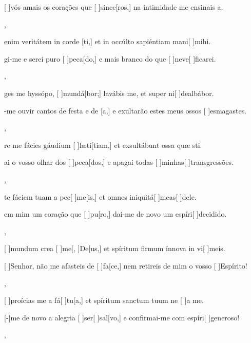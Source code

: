 {    {\item {}[ ]{vós} amais os corações que [ ]{sin}{ce}[ros,] na intimidade me ensinais a.~\Antiphona},
  {\item {} enim veritátem in corde [ti,] et in occúlto sapiéntiam mani[ ]{mi}hi.~\Antiphona}%
    {\item {}gi-me e serei puro [ ]{pe}{ca}[do,] e mais branco do que [ ]{ne}{ve}[ ]{fica}rei.~\Antiphona},
  {\item {}ges me hyssópo, [ ]{mun}{dá}[bor;] lavábis me, et super ni[ ]{de}{al}{bá}bor.~\Antiphona}%
    {\item {}-me ouvir cantos de festa e de [a,] e exultarão estes meus ossos [ ]{es}{ma}{gas}tes.~\Antiphona},
  {\item {}re me fácies gáudium [ ]{læ}{tí}[tiam,] et exsultábunt ossa quæ sti.~\Antiphona}%
    {\item {}ai o vosso olhar dos [ ]{pe}{ca}[dos,] e apagai todas [ ]{mi}{nhas}[ ]{transgres}sões.~\Antiphona},
  {\item {}te fáciem tuam a pec[ ]{me}[is,] et omnes iniquitá[ ]{me}{as}[ ]{de}le.~\Antiphona}%
    {\item {} em mim um coração que [ ]{pu}[ro,] dai-me de novo um espíri[ ]{de}{ci}{di}do.~\Antiphona},
  {\item {}[ ]{mun}dum crea [ ]{me}[, ]{De}[us,] et spíritum firmum ínnova in vi[ ]{me}is.~\Antiphona}%
    {\item {}[ ]{Se}nhor, não me afasteis de [ ]{fa}[ce,] nem retireis de mim o vosso [ ]{Es}{píri}to!~\Antiphona},
  {\item {}[ ]{pro}ícias me a fá[ ]{tu}[a,] et spíritum sanctum tuum ne [ ]{a} me.~\Antiphona}%
    {\item {}[-]{me} de novo a alegria [ ]{ser}[ ]{sal}[vo,] e confir\-mai-me com espíri[ ]{ge}{ne}{ro}so!~\Antiphona},
}
